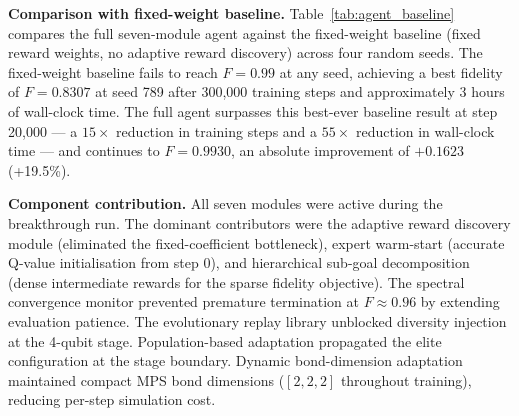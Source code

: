 \textbf{Comparison with fixed-weight baseline.}
Table~\ref{tab:agent_baseline} compares the full seven-module agent against the
fixed-weight baseline (fixed reward weights, no adaptive reward discovery) across
four random seeds.
The fixed-weight baseline fails to reach $F = 0.99$ at any seed, achieving a
best fidelity of $F = 0.8307$ at seed 789 after 300,000 training steps and
approximately 3 hours of wall-clock time.
The full agent surpasses this best-ever baseline result at step 20,000 --- a
$15\times$ reduction in training steps and a $55\times$ reduction in wall-clock
time --- and continues to $F = 0.9930$, an absolute improvement of $+0.1623$
(+19.5\%).

\begin{table}[h]
\centering
\caption{Full agent vs.\ fixed-weight baseline at 4 qubits. The full agent is
the only configuration to cross the fault-tolerance threshold $F \geq 0.99$.}
\label{tab:agent_baseline}
\end{table}

\textbf{Component contribution.}
All seven modules were active during the breakthrough run.
The dominant contributors were the adaptive reward discovery module (eliminated
the fixed-coefficient bottleneck), expert warm-start (accurate Q-value
initialisation from step 0), and hierarchical sub-goal decomposition (dense
intermediate rewards for the sparse fidelity objective).
The spectral convergence monitor prevented premature termination at
$F \approx 0.96$ by extending evaluation patience.
The evolutionary replay library unblocked diversity injection at the 4-qubit
stage.
Population-based adaptation propagated the elite configuration at the stage
boundary.
Dynamic bond-dimension adaptation maintained compact MPS bond dimensions
($[2,2,2]$ throughout training), reducing per-step simulation cost.

